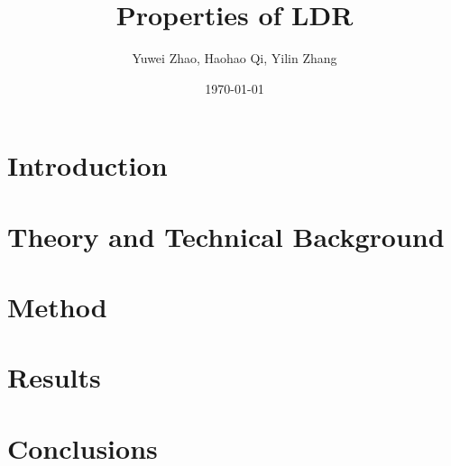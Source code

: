 \documentclass[12pt]{article}
\title{Properties of LDR}
\author{Yuwei Zhao, Haohao Qi, Yilin Zhang}
\date{\today}
\begin{document}
\maketitle

\section{Introduction} %
\label{sec:introduction} %


\section{Theory and Technical Background} %
\label{sec:theory_and_technical_background} %


\section{Method} %
\label{sec:method} %


\section{Results} %
\label{sec:results}


\section{Conclusions} %
\label{sec:conclusions} %

\end{document}
